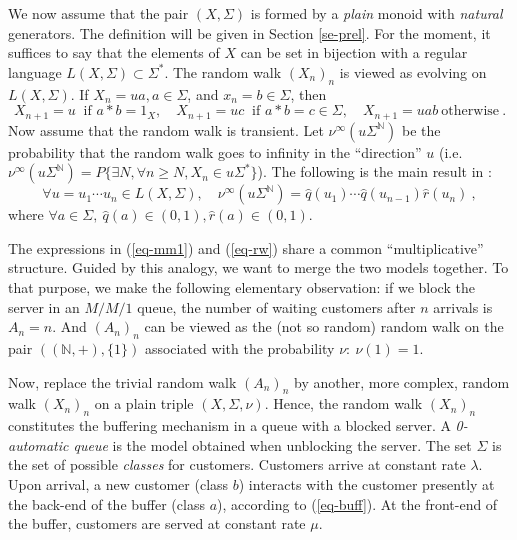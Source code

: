 \documentclass[11pt,a4paper]{article}
\theoremstyle{remark}
\def\Blackboardfont{\mathbb}
\def\N{{\Blackboardfont N}}
\def\eref#1{(\ref{#1})}
\begin{document}
We now assume that the pair $(X,\Sigma)$ is formed by a {\em plain} monoid
with {\em natural} generators. The
definition will be given in Section \ref{se-prel}. For the
moment, it suffices to say that the  elements of $X$ can be set in
bijection with a regular language $L(X,\Sigma)\subset \Sigma^*$.
The random walk $(X_n)_n$ is viewed as evolving on $L(X,\Sigma)$.
If $X_n=ua, a\in \Sigma$, and $x_n=b\in
\Sigma$, then
\begin{equation}\label{eq-buff}
X_{n+1} = u \ \text{ if } a\ast b =1_X, \quad X_{n+1} = uc \
\text{ if } a\ast b =c \in \Sigma, \quad X_{n+1} = uab \ \text{
otherwise} \:.
\end{equation}
Now assume that the random walk is transient. Let
$\nu^{\infty}(u\Sigma^{\N})$ be the probability that the random
walk goes to infinity in the ``direction'' $u$ (i.e.
$\nu^{\infty}(u\Sigma^{\N})=P\{ \exists N, \forall n\geq N, X_n
\in u\Sigma^*\}$). The following is the main result in
\cite{mair04}:
\begin{equation}\label{eq-rw}
\forall u=u_1\cdots u_n \in L(X,\Sigma), \quad \nu^{\infty}
(u\Sigma^{\N}) = \widehat{q}(u_1)\cdots
\widehat{q}(u_{n-1})\widehat{r}(u_n)\:,
\end{equation}
where $\forall a\in \Sigma, \ \widehat{q}(a)\in (0,1),
\widehat{r}(a)\in (0,1)$.

\medskip

The expressions in \eref{eq-mm1} and \eref{eq-rw} share a common
``multiplicative'' structure.
Guided by this analogy, we want to merge the two models together.
To that purpose, we make the following
elementary observation: if we block the server in an $M/M/1$ queue,
the number of waiting customers after $n$ arrivals is $A_n=n$. And
$(A_n)_n$ can be viewed as the (not so random) random walk on the
pair $((\N,+),\{1\})$ associated with the probability $\nu: \
\nu(1)=1$.

Now, replace the trivial random walk $(A_n)_n$ by another, more
complex, random walk $(X_n)_n$ on a plain triple $(X,\Sigma,\nu)$.
Hence, the random walk $(X_n)_n$ constitutes the buffering
mechanism in a queue with a blocked server. A {\em 0-automatic
queue} is the model obtained when unblocking the server. The set
$\Sigma$ is the set of possible {\em classes} for customers. Customers
arrive at constant rate $\lambda$. Upon
arrival, a new customer (class $b$) interacts with the customer
presently at the back-end of the buffer (class $a$), according to
\eref{eq-buff}. At the front-end of the buffer, customers are
served at constant rate $\mu$. 
\end{document}

